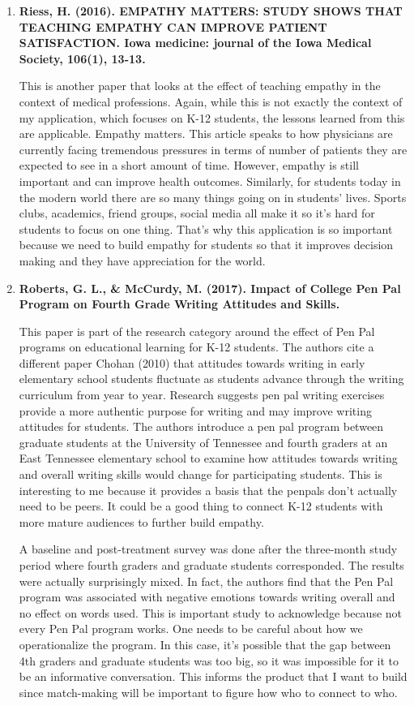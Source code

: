 \documentclass[12pt, final]{article}
\begin{document}
\begin{enumerate}
\item \textbf{Riess, H. (2016). EMPATHY MATTERS: STUDY SHOWS THAT TEACHING EMPATHY CAN IMPROVE PATIENT SATISFACTION. Iowa medicine: journal of the Iowa Medical Society, 106(1), 13-13.}

This is another paper that looks at the effect of teaching empathy in the context of medical professions. Again, while this is not exactly the context of my application, which focuses on K-12 students, the lessons learned from this are applicable. Empathy matters. This article speaks to how physicians are currently facing tremendous pressures in terms of number of patients they are expected to see in a short amount of time. However, empathy is still important and can improve health outcomes. Similarly, for students today in the modern world there are so many things going on in students' lives. Sports clubs, academics, friend groups, social media all make it so it's hard for students to focus on one thing. That's why this application is so important because we need to build empathy for students so that it improves decision making and they have appreciation for the world. 

\item \textbf{Roberts, G. L., \& McCurdy, M. (2017). Impact of College Pen Pal Program on Fourth Grade Writing Attitudes and Skills.}

This paper is part of the research category around the effect of Pen Pal programs on educational learning for K-12 students. The authors cite a different paper Chohan (2010) that attitudes towards writing in early elementary school students fluctuate as students advance through the writing curriculum from year to year. Research suggests pen pal writing exercises provide a more authentic purpose for writing and may improve writing attitudes for students. The authors introduce a pen pal program between graduate students at the University of Tennessee and fourth graders at an East Tennessee elementary school to examine how attitudes towards writing and overall writing skills would change for participating students. This is interesting to me because it provides a basis that the penpals don't actually need to be peers. It could be a good thing to connect K-12 students with more mature audiences to further build empathy. 

A baseline and post-treatment survey was done after the three-month study period where fourth graders and graduate students corresponded. The results were actually surprisingly mixed. In fact, the authors find that the Pen Pal program was associated with negative emotions towards writing overall and no effect on words used. This is important study to acknowledge because not every Pen Pal program works. One needs to be careful about how we operationalize the program. In this case, it's possible that the gap between 4th graders and graduate students was too big, so it was impossible for it to be an informative conversation. This informs the product that I want to build since match-making will be important to figure how who to connect to who.


\end{enumerate}
\end{document}
